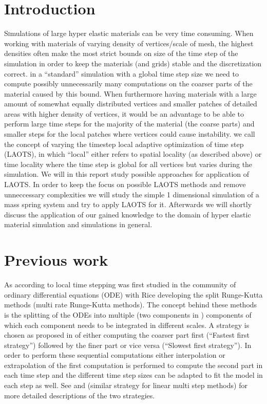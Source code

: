 \documentclass[twoside]{article}
\begin{document}
\begin{multicols}{2} %

\section{Introduction}
\lettrine[nindent=0em,lines=3]{S} imulations of large hyper elastic materials
can be very time consuming. When working with materials of varying density
of vertices/scale of mesh, the highest densities often make the most
strict bounds on size of the time step of the simulation in order to keep
the materials (and grids) stable and the discretization correct. in a
``standard'' simulation with a global time step size we need to compute
possibly unnecessarily many computations on the coarser parts of the material
caused by this bound. When furthermore having materials with a large amount
of somewhat equally distributed vertices and smaller patches of detailed
areas with higher density of vertices, it would be an advantage to be able
to perform large time steps for the majority of the material (the coarse
parts) and smaller steps for the local patches where vertices could cause
instability. we call the concept of varying the timestep local adaptive
optimization of time step (LAOTS), in which ``local'' either refers to spatial
locality (as described above) or time locality where the time step is global
for all vertices but varies during the simulation. We will in this report
study possible approaches for application of LAOTS. In order to keep the focus
on possible LAOTS methods and remove unneccessary complexities we will study
the simple 1 dimensional simulation of a mass spring system and try to apply
LAOTS for it. Afterwards we will shortly discuss the application of our gained
knowledge to the domain of hyper elastic material simulation and simulations
in general.


\section{Previous work}
As according to \cite{Gander:2013} local time stepping was first studied
in the community of ordinary differential equations (ODE) with Rice
\cite{rice:1960} developing the split Runge-Kutta methods (multi rate
Runge-Kutta methods). The concept behind these methods is the splitting of
the ODEs into multiple (two components in \cite{rice:1960}) components of
which each component needs to be integrated in different scales. A strategy
is chosen as proposed in \cite{Kvaernoe:1999} of either computing the coarser
part first (``Fastest first strategy'') followed by the finer part or vice
versa (``Slowest first strategy''). In order to perform these sequential
computations either interpolation or extrapolation of the first computation
is performed to compute the second part in each time step and the different
time step sizes can be adapted to fit the model in each step as well. See
\cite{Kvaernoe:1999} and \cite{Gear:1984} (similar strategy for linear multi
step methods) for more detailed descriptions of the two strategies.


\end{multicols}
\end{document}
